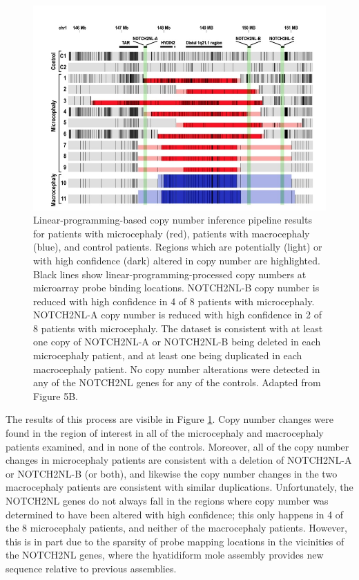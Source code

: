 \documentclass[11pt,proposal]{ucthesis}
\begin{document}
\begin{figure}[h!t]
    \centering
    \includegraphics[width=1.0\textwidth]{figures/notch2nl.png}
    \caption{Linear-programming-based copy number inference pipeline results for patients with microcephaly (red), patients with macrocephaly (blue), and control patients. Regions which are potentially (light) or with high confidence (dark) altered in copy number are highlighted. Black lines show linear-programming-processed copy numbers at microarray probe binding locations. NOTCH2NL-B copy number is reduced with high confidence in 4 of 8 patients with microcephaly. NOTCH2NL-A copy number is reduced with high confidence in 2 of 8 patients with microcephaly. The dataset is consistent with at least one copy of NOTCH2NL-A or NOTCH2NL-B being deleted in each microcephaly patient, and at least one being duplicated in each macrocephaly patient. No copy number alterations were detected in any of the NOTCH2NL genes for any of the controls. Adapted from \cite{jacobs2014recently} Figure 5B.}
    \label{fig:notch2nl}
\end{figure}

The results of this process are visible in Figure \ref{fig:notch2nl}. Copy number changes were found in the region of interest in all of the microcephaly and macrocephaly patients examined, and in none of the controls. Moreover, all of the copy number changes in microcephaly patients are consistent with a deletion of NOTCH2NL-A or NOTCH2NL-B (or both), and likewise the copy number changes in the two macrocephaly patients are consistent with similar duplications. Unfortunately, the NOTCH2NL genes do not always fall in the regions where copy number was determined to have been altered with high confidence; this only happens in 4 of the 8 microcephaly patients, and neither of the macrocephaly patients. However, this is in part due to the sparsity of probe mapping locations in the vicinities of the NOTCH2NL genes, where the hyatidiform mole assembly provides new sequence relative to previous assemblies.
\end{document}

